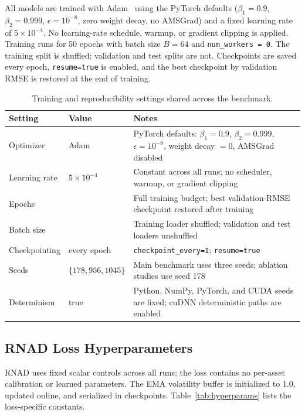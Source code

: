\documentclass[11pt]{article}
\newcommand{\RNAD}{RNAD\xspace}
\begin{document}
All models are trained with Adam~\citep{kingma2015adam} using the
PyTorch defaults ($\beta_1 = 0.9$, $\beta_2 = 0.999$,
$\epsilon = 10^{-8}$, zero weight decay, no AMSGrad) and a fixed
learning rate of $5 \times 10^{-4}$. No learning-rate schedule,
warmup, or gradient clipping is applied. Training runs for 50 epochs
with batch size $B = 64$ and \texttt{num\_workers = 0}. The training
split is shuffled; validation and test splits are not. Checkpoints
are saved every epoch, \texttt{resume=true} is enabled, and the best
checkpoint by validation RMSE is restored at the end of training.

\begin{table}[t]
\centering
\caption{Training and reproducibility settings shared across the
  benchmark.}
\label{tab:training-config}
\small
\begin{tabularx}{\textwidth}{l>{\raggedright\arraybackslash}X>{\raggedright\arraybackslash}X}
\toprule
Setting & Value & Notes \\
\midrule
Optimizer & Adam & PyTorch defaults: $\beta_1 = 0.9$, $\beta_2 = 0.999$,
  $\epsilon = 10^{-8}$, weight decay $= 0$, AMSGrad disabled \\
Learning rate & $5 \times 10^{-4}$ & Constant across all runs; no
  scheduler, warmup, or gradient clipping \\
Epochs & 50 & Full training budget; best validation-RMSE checkpoint
  restored after training \\
Batch size & 64 & Training loader shuffled; validation and test
  loaders unshuffled \\
Checkpointing & every epoch & \texttt{checkpoint\_every=1};
  \texttt{resume=true} \\
Seeds & $\{178, 956, 1045\}$ & Main benchmark uses three seeds;
  ablation studies use seed 178 \\
Determinism & true & Python, NumPy, PyTorch, and CUDA seeds are
  fixed; cuDNN deterministic paths are enabled \\
\bottomrule
\end{tabularx}
\end{table}

\subsection{RNAD Loss Hyperparameters}

\RNAD uses fixed scalar controls across all runs; the loss contains
no per-asset calibration or learned parameters. The EMA volatility
buffer is initialized to 1.0, updated online, and serialized in
checkpoints. Table~\ref{tab:hyperparams} lists the loss-specific
constants.
\end{document}

